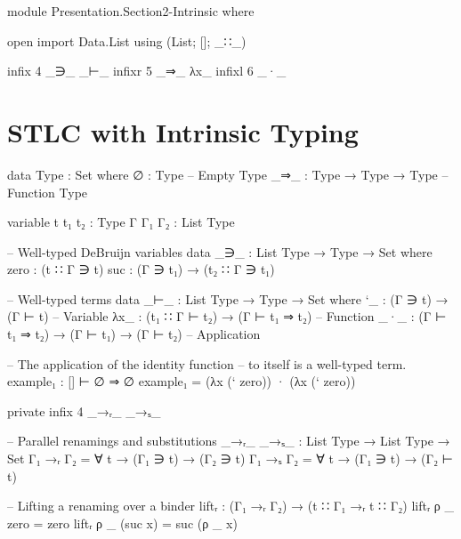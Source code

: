 \begin{code}[hide]
module Presentation.Section2-Intrinsic where

open import Data.List using (List; []; _∷_)

infix  4  _∋_  _⊢_
infixr 5  _⇒_  λx_
infixl 6  _·_
\end{code}

\section{STLC with Intrinsic Typing}

\begin{frame}
\begin{code}
data Type : Set where
  ∅    : Type                -- Empty Type
  _⇒_  : Type → Type → Type  -- Function Type

variable
  t t₁ t₂  : Type
  Γ Γ₁ Γ₂  : List Type
\end{code}
\end{frame}

\begin{frame}
\begin{code}
-- Well-typed DeBruijn variables
data _∋_ : List Type → Type → Set where
  zero  : (t ∷ Γ ∋ t)
  suc   : (Γ ∋ t₁) → (t₂ ∷ Γ ∋ t₁)

-- Well-typed terms
data _⊢_ : List Type → Type → Set where
  `_   : (Γ ∋ t) → (Γ ⊢ t)                    -- Variable
  λx_  : (t₁ ∷ Γ ⊢ t₂) → (Γ ⊢ t₁ ⇒ t₂)        -- Function
  _·_  : (Γ ⊢ t₁ ⇒ t₂) → (Γ ⊢ t₁) → (Γ ⊢ t₂)  -- Application
\end{code}
\end{frame}

\begin{code}[hide]
-- The application of the identity function
-- to itself is a well-typed term.
example₁ : [] ⊢ ∅ ⇒ ∅
example₁ = (λx (` zero)) · (λx (` zero))

private
  infix  4  _→ᵣ_  _→ₛ_
\end{code}

\begin{frame}
\begin{code}
  -- Parallel renamings and substitutions
  _→ᵣ_ _→ₛ_ : List Type → List Type → Set
  Γ₁ →ᵣ Γ₂ = ∀ t → (Γ₁ ∋ t) → (Γ₂ ∋ t)
  Γ₁ →ₛ Γ₂ = ∀ t → (Γ₁ ∋ t) → (Γ₂ ⊢ t)
\end{code}
\end{frame}

\begin{frame}
\begin{code}
  -- Lifting a renaming over a binder
  liftᵣ : (Γ₁ →ᵣ Γ₂) → (t ∷ Γ₁ →ᵣ t ∷ Γ₂)
  liftᵣ ρ _ zero     = zero
  liftᵣ ρ _ (suc x)  = suc (ρ _ x)
\end{code}
\end{frame}

